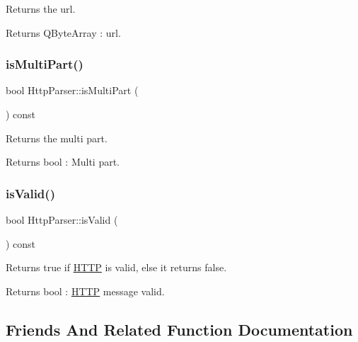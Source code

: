 Returns the url. 

\begin{DoxyReturn}{Returns}
Q\+Byte\+Array \+: url. 
\end{DoxyReturn}
\mbox{\label{class_http_parser_acbb3148607d2a3c80ba4e74573165f1d}} 
\subsubsection{\texorpdfstring{is\+Multi\+Part()}{isMultiPart()}}
{\footnotesize\ttfamily bool Http\+Parser\+::is\+Multi\+Part (\begin{DoxyParamCaption}{ }\end{DoxyParamCaption}) const}



Returns the multi part. 

\begin{DoxyReturn}{Returns}
bool \+: Multi part. 
\end{DoxyReturn}
\mbox{\label{class_http_parser_a75e0872ac2323b7bd583ea5547503a50}} 
\subsubsection{\texorpdfstring{is\+Valid()}{isValid()}}
{\footnotesize\ttfamily bool Http\+Parser\+::is\+Valid (\begin{DoxyParamCaption}{ }\end{DoxyParamCaption}) const}



Returns true if \hyperlink{namespace_h_t_t_p}{H\+T\+TP} is valid, else it returns false. 

\begin{DoxyReturn}{Returns}
bool \+: \hyperlink{namespace_h_t_t_p}{H\+T\+TP} message valid. 
\end{DoxyReturn}


\subsection{Friends And Related Function Documentation}
\mbox{\label{class_http_parser_a4d54f5003e07e218070a449c22a52c7c}} 

